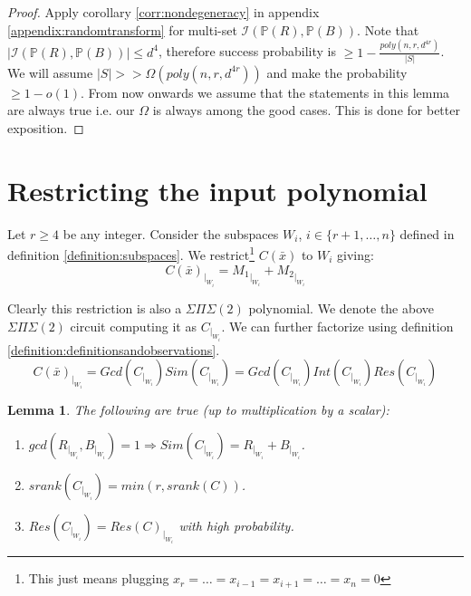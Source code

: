 \documentclass[12pt]{caltech_thesis}
\theoremstyle{plain}
\newtheorem{lemma}{Lemma}
\theoremstyle{definition}
\newcommand{\MI}{\mathcal{I}}
\newcommand{\PP}{\mathbb{P}}
\newcommand{\B}[1]{\bar{#1}}
\begin{document}
\begin{proof}
 Apply corollary \ref{corr:nondegeneracy} in appendix \ref{appendix:randomtransform} for multi-set $\MI(\PP(R),\PP(B))$. 
 Note that $|\MI(\PP(R),\PP(B))| \leq d^4$, therefore
success probability is $\geq 1-\frac{poly(n,r,d^{4r})}{|S|}$. 
We will assume $|S|>> \Omega(poly(n,r,d^{4r}))$ and make the probability $\geq 1-o(1)$. From now onwards
 we assume that the statements in this lemma are always true i.e. 
our $\Omega$ is always among the good cases. This is done for better exposition.
\end{proof}




\section{Restricting the input polynomial}\label{subsection:restrict}
Let $r\geq 4$ be any integer. Consider the subspaces $W_i$, $i\in \{r+1,\ldots,n\}$ defined in definition \ref{definition:subspaces}.
We restrict\footnote{ This just means plugging $x_r = \ldots = x_{i-1} = x_{i+1} = \ldots =x_n=0$ } 
$C(\B{x})$ to $W_i$ giving:
\[
C(\B{x})_{|_{W_i}} = {M_1}_{|_{W_i}} + {M_2}_{|_{W_i}} 
\]

Clearly this restriction is also a $\Sigma\Pi\Sigma(2)$ polynomial. We denote the above $\Sigma\Pi\Sigma(2)$ 
circuit computing it as $C_{|_{W_i}}$. We can further factorize using definition \ref{definition:definitionsandobservations}.
\[
C(\B{x})_{|_{W_i}} =  Gcd(C_{|_{W_i}})Sim(C_{|_{W_i}}) = 
Gcd(C_{|_{W_i}})Int(C_{|_{W_i}})Res(C_{|_{W_i}}) 
\]


\begin{lemma}\label{lemma:proj}
The following are true (up to multiplication by a scalar):
\begin{enumerate}
 \item \label{bullet:simpleproj} $gcd(R_{|_{W_i}}, B_{|_{W_i}})=1 \Rightarrow Sim(C_{|_{W_i}}) = R_{|_{W_i}} + B_{|_{W_i}}$.
 \item \label{bullet:rankproj} $srank(C_{|_{W_i}}) = min(r, srank(C))$.
\item \label{bullet:residuals}$Res(C_{|_{W_i}}) = Res(C)_{|_{W_i}}$ with high probability.
\end{enumerate}
\end{lemma}
\end{document}
